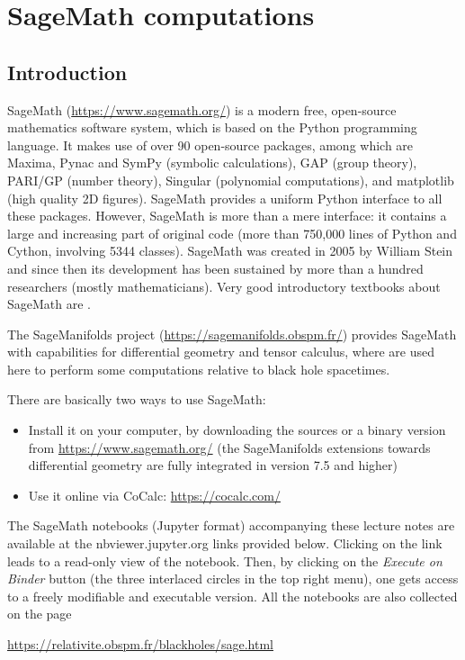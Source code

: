 \chapter{SageMath computations} \label{s:sam}

\minitoc

\section{Introduction}


\textsf{SageMath} (\url{https://www.sagemath.org/}) is a modern free,
open-source mathematics software system, which is
based on the Python programming language. It makes use of over 90 open-source packages,
among which are \textsf{Maxima}, \textsf{Pynac} and \textsf{SymPy} (symbolic calculations),
\textsf{GAP} (group theory),
\textsf{PARI/GP} (number theory), \textsf{Singular} (polynomial computations),
and \textsf{matplotlib} (high quality 2D figures).
\textsf{SageMath} provides a uniform Python interface to all these packages. However,
\textsf{SageMath} is more than a mere interface: it contains a large and increasing part of
original code (more than 750,000 lines of Python and Cython, involving 5344 classes).
\textsf{SageMath} was created in 2005 by William Stein \cite{SteinJ05} and since
then its development has been sustained by more than a hundred researchers
(mostly mathematicians). Very good introductory textbooks about \textsf{SageMath} are
\cite{Zimme18,JoyneS14,Bard15}.

The \textsf{SageManifolds} project (\url{https://sagemanifolds.obspm.fr/})
provides \textsf{SageMath} with capabilities for differential geometry and tensor calculus,
where are used here to perform some computations relative to black hole spacetimes.


There are basically two ways to use \textsf{SageMath}:
\begin{itemize}
\item Install it on your computer, by downloading the sources or a binary version
from \url{https://www.sagemath.org/} (the \textsf{SageManifolds} extensions towards
differential geometry are fully integrated in version 7.5 and higher)
\item Use it online via \textsf{CoCalc}: \url{https://cocalc.com/}
\end{itemize}


The SageMath notebooks (Jupyter format) accompanying these lecture notes are available
at the \textsf{nbviewer.jupyter.org} links provided below.
Clicking on the link leads to a read-only view of the notebook. Then,
by clicking on the \emph{Execute on Binder} button (the three interlaced circles
in the top right menu), one gets access to a freely modifiable and executable version.
All the notebooks are also collected on the page
\begin{center}
\url{https://relativite.obspm.fr/blackholes/sage.html}
\end{center}

